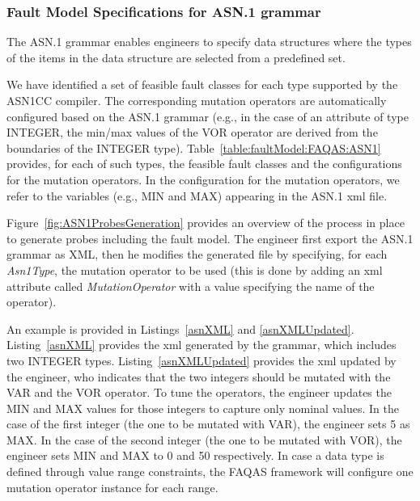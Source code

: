 \clearpage
\subsubsection{Fault Model Specifications for ASN.1 grammar}
\label{subsub:asn1model}

The ASN.1 grammar enables engineers to specify data structures where the types of the items in the data structure are selected from a predefined set.


We have identified a set of feasible fault classes for each type supported by the ASN1CC compiler.
The corresponding mutation operators are automatically configured based on the ASN.1 grammar (e.g., in the case of an attribute of type INTEGER, the min/max values of the VOR operator are derived from the boundaries of the INTEGER type).
Table~\ref{table:faultModel:FAQAS:ASN1} provides, for each of such types, the feasible fault classes and the configurations for the mutation operators.
In the configuration for the mutation operators, we refer to the variables (e.g., MIN and MAX) appearing in the ASN.1 xml file.

Figure~\ref{fig:ASN1ProbesGeneration} provides an overview of the process in place to generate probes including the fault model.
The engineer first export the ASN.1 grammar as XML, then he modifies the generated file by specifying, for each \emph{Asn1Type}, the mutation operator to be used (this is done by adding an xml attribute called \emph{MutationOperator} with a value specifying the name of the operator). 

An example is provided in Listings~\ref{asnXML} and \ref{asnXMLUpdated}. Listing~\ref{asnXML} provides the xml generated by the grammar, which includes two INTEGER types.
Listing~\ref{asnXMLUpdated} provides the xml updated by the engineer, who indicates that the two integers should be mutated with the VAR and the VOR operator. To tune the operators, the engineer updates the MIN and MAX values for those integers to capture only nominal values. 
In the case of the first integer (the one to be mutated with VAR), the engineer sets 5 as MAX.
In the case of the second integer (the one to be mutated with VOR), the engineer sets MIN and MAX to 0 and 50 respectively.
In case a data type is defined through value range constraints, the FAQAS framework will configure one mutation operator instance for each range.

